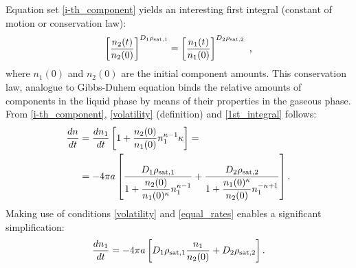 \documentclass[twoside,twocolumn,9pt]{article}
\begin{document}
Equation set \ref{i-th_component} yields an interesting first integral (constant of motion or conservation law):
\begin{equation}
\left[\frac{n_2(t)}{n_{2}(0)}\right]^{D_1\rho_{{\rm sat},1}}=\left[\frac{n_1(t)}{n_{1}(0)}\right]^{D_2\rho_{{\rm sat},2}} \mbox{~,}
\label{1st_integral}
\end{equation}
where $n_{1}(0)$ and $n_{2}(0)$ are the initial component amounts. This conservation law, analogue to Gibbs-Duhem equation binds the relative amounts of components in the liquid phase by means of their properties in the gaseous phase. From \ref{i-th_component}, \ref{volatility} (definition) and \ref{1st_integral} follows:
\begin{align}
\frac{dn}{dt} & = \frac{dn_1}{dt}\left[ 1+\dfrac{n_{2}(0)}{n_{1}(0)}n_1^{\kappa - 1} \kappa \right]= \nonumber\\
& =-4\pi a \left[ \frac{D_1\rho_{{\rm sat},1}}{1+\dfrac{n_{2}(0)}{n_{1}(0)^{\kappa}}n_1^{\kappa - 1}} + \dfrac{D_2\rho_{{\rm sat},2}}{1+\dfrac{n_{1}(0)^{\kappa}}{n_{2}(0)}n_1^{-\kappa +1}} \right] \mbox{.}
\label{n1_a}
\end{align}
Making use of conditions \ref{volatility} and \ref{equal_rates} enables a significant simplification:
\begin{equation}
\frac{dn_1}{dt} = -4\pi a \left[ D_1\rho_{{\rm sat},1}\frac{n_1}{n_{2}(0)} + D_2\rho_{{\rm sat},2} \right] \mbox{.}
\label{simplified}
\end{equation}
\end{document}
